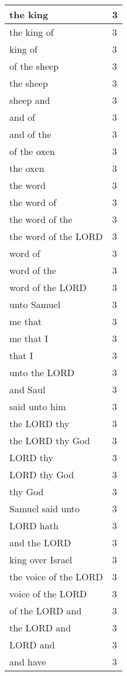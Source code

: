 \begin{center}
\begin{longtable}{|p{3.0in}|p{0.5in}|}
the king & 3\\ \hline 
the king of & 3\\ \hline 
king of & 3\\ \hline 
of the sheep & 3\\ \hline 
the sheep & 3\\ \hline 
sheep and & 3\\ \hline 
and of & 3\\ \hline 
and of the & 3\\ \hline 
of the oxen & 3\\ \hline 
the oxen & 3\\ \hline 
the word & 3\\ \hline 
the word of & 3\\ \hline 
the word of the & 3\\ \hline 
the word of the LORD & 3\\ \hline 
word of & 3\\ \hline 
word of the & 3\\ \hline 
word of the LORD & 3\\ \hline 
unto Samuel & 3\\ \hline 
me that & 3\\ \hline 
me that I & 3\\ \hline 
that I & 3\\ \hline 
unto the LORD & 3\\ \hline 
and Saul & 3\\ \hline 
said unto him & 3\\ \hline 
the LORD thy & 3\\ \hline 
the LORD thy God & 3\\ \hline 
LORD thy & 3\\ \hline 
LORD thy God & 3\\ \hline 
thy God & 3\\ \hline 
Samuel said unto & 3\\ \hline 
LORD hath & 3\\ \hline 
and the LORD & 3\\ \hline 
king over Israel & 3\\ \hline 
the voice of the LORD & 3\\ \hline 
voice of the LORD & 3\\ \hline 
of the LORD and & 3\\ \hline 
the LORD and & 3\\ \hline 
LORD and & 3\\ \hline 
and have & 3\\ \hline 
\end{longtable}
\end{center}





